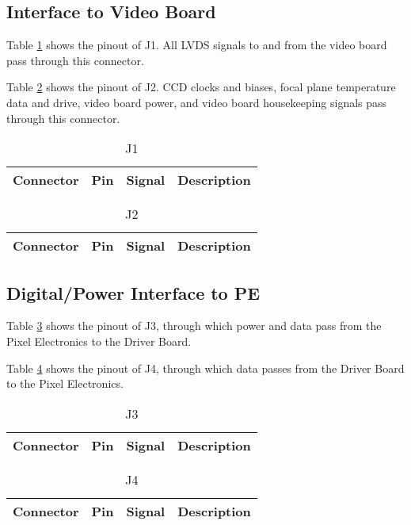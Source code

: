\documentclass[a4paper,12pt]{article}
\begin{document}
\subsection{Interface to Video Board}

Table \ref{J1} shows the pinout of J1. All LVDS signals to and from the video board pass through this connector.

Table \ref{J2} shows the pinout of J2. CCD clocks and biases, focal plane temperature data and drive, video board power, and video board housekeeping signals pass through this connector.

\begin{table}[h]
\centering
\begin{tabular}{|l|l|l|l|}
\hline
 Connector & Pin & Signal & Description \\
\hline

\hline
\end{tabular}
\caption{J1}
\label{J1}
\end{table}

\begin{table}[h]
\centering
{\small
\begin{tabular}{|l|l|l|l|}
\hline
 Connector & Pin & Signal & Description \\
\hline

\hline
\end{tabular}
}
\caption{J2}
\label{J2}
\end{table}

\subsection{Digital/Power Interface to PE}

Table \ref{J3} shows the pinout of J3, through which power and data pass from the Pixel Electronics to the Driver Board.

Table \ref{J4} shows the pinout of J4, through which data passes from the Driver Board to the Pixel Electronics.

\begin{table}[h]
\centering
{\small
\begin{tabular}{|l|l|l|l|}
\hline
 Connector & Pin & Signal & Description \\
\hline

\hline
\end{tabular}
}
\caption{J3}
\label{J3}
\end{table}

\begin{table}[h]
\centering
{\small
\begin{tabular}{|l|l|l|l|}
\hline
 Connector & Pin & Signal & Description \\
\hline

\hline
\end{tabular}
}
\caption{J4}
\label{J4}
\end{table}


  
\end{document}
